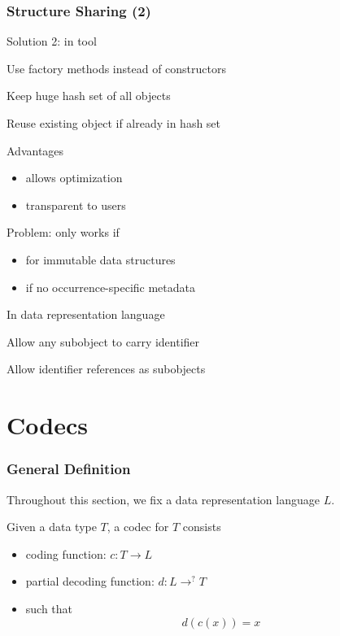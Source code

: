 \documentclass{beamer}
\begin{document}
\begin{frame}\frametitle{Structure Sharing (2)}
\begin{blockitems}{Solution 2: in tool}
\item Use factory methods instead of constructors
\item Keep huge hash set of all objects
\item Reuse existing object if already in hash set
\item Advantages
 \begin{itemize}
  \item allows optimization
  \item transparent to users
 \end{itemize}
\item Problem: only works if 
 \begin{itemize}
  \item for immutable data structures
  \item if no occurrence-specific metadata 
 \end{itemize}
\end{blockitems}

\begin{blockitems}{In data representation language}
\item Allow any subobject to carry identifier
\item Allow identifier references as subobjects
\end{blockitems}
\end{frame}

\section{Codecs}

\begin{frame}\frametitle{General Definition}
Throughout this section, we fix a data representation language $L$.

Given a data type $T$, a codec for $T$ consists
\begin{itemize}
 \item coding function: $c:T \to L$
 \item partial decoding function: $d:L\to^? T$
 \item such that
  \[d(c(x))=x\]
\end{itemize}
\end{frame}
\end{document}
